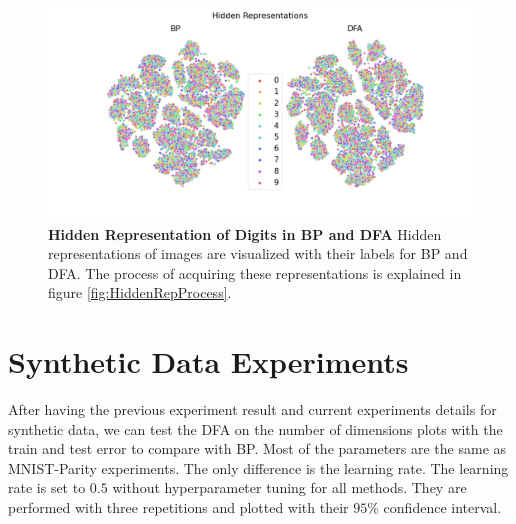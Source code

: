 \documentclass[a4paper, nobind]{templates/ociamthesis}
\begin{document}
\begin{figure}

{\centering \includegraphics[width=1\linewidth]{figures/3_tsne_BPDFA} 

}

\caption[Hidden Representation of Digits in BP and DFA]{\textbf{Hidden Representation of Digits in BP and DFA} \newline Hidden representations of images are visualized with their labels for BP and DFA. The process of acquiring these representations is explained in figure \ref{fig:HiddenRepProcess}.}\label{fig:tSNEBPDFA}
\end{figure}

\hypertarget{synthetic-data-experiments}{%
\section{Synthetic Data Experiments}\label{synthetic-data-experiments}}

After having the previous experiment result and current experiments details for synthetic data, we can test the DFA on the number of dimensions plots with the train and test error to compare with BP. Most of the parameters are the same as MNIST-Parity experiments. The only difference is the learning rate. The learning rate is set to \(0.5\) without hyperparameter tuning for all methods. They are performed with three repetitions and plotted with their \(95\%\) confidence interval.
\end{document}
